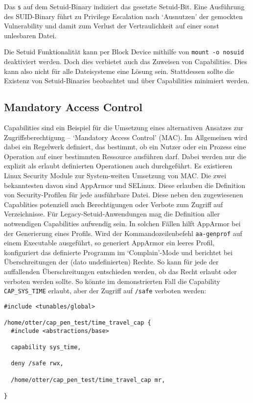 Das \texttt{s} auf dem Setuid-Binary indiziert das gesetzte Setuid-Bit. Eine Ausführung des SUID-Binary führt zu Privilege Escalation nach `Ausnutzen' der gemockten Vulnerability und damit zum Verlust der Vertraulichkeit auf einer sonst unlesbaren Datei.

Die Setuid Funktionalität kann per Block Device mithilfe von \texttt{mount -o nosuid} deaktiviert werden. Doch dies verbietet auch das Zuweisen von Capabilities. Dies kann also nicht für alle Dateisysteme eine Lösung sein. Stattdessen sollte
die Existenz von Setuid-Binaries beobachtet und über Capabilities minimiert werden.

\subsection{Mandatory Access Control}

Capabilities sind ein Beispiel für die Umsetzung eines alternativen Ansatzes zur Zugriffsberechtigung -- `Mandatory Access Control' (MAC). Im Allgemeinen wird dabei ein Regelwerk definiert, das bestimmt, ob ein Nutzer oder ein Prozess eine Operation auf einer bestimmten Ressource ausführen darf. Dabei werden nur die explizit als erlaubt definierten Operationen auch durchgeführt. Es existieren Linux Security Module zur System-weiten Umsetzung von MAC. Die zwei bekanntesten davon
sind AppArmor und SELinux. Diese erlauben die Definition von Security-Profilen für jede ausführbare Datei. Diese neben den zugewiesenen Capablities potenziell auch Berechtigungen oder Verbote zum Zugriff auf Verzeichnisse. Für Legacy-Setuid-Anwendungen mag die Definition aller notwendigen Capabilities aufwendig sein. In solchen Fällen hilft AppArmor bei der Generierung eines Profils. Wird der Kommandozeilenbefehl \texttt{aa-genprof} auf einem Executable ausgeführt, so generiert
AppArmor ein leeres Profil, konfiguriert das definierte Programm im `Complain'-Mode und berichtet bei Überschreitungen der (dato undefinierten) Rechte. So kann für jede der auffallenden Überschreitungen entschieden werden, ob das Recht erlaubt oder verboten werden sollte. So könnte im demonstrierten Fall die Capability \texttt{CAP\_SYS\_TIME} erlaubt, aber der Zugriff auf \texttt{/safe} verboten werden:

\begin{lstlisting}
#include <tunables/global>

/home/otter/cap_pen_test/time_travel_cap {
  #include <abstractions/base>

  capability sys_time,

  deny /safe rwx,

  /home/otter/cap_pen_test/time_travel_cap mr,

}
\end{lstlisting}



